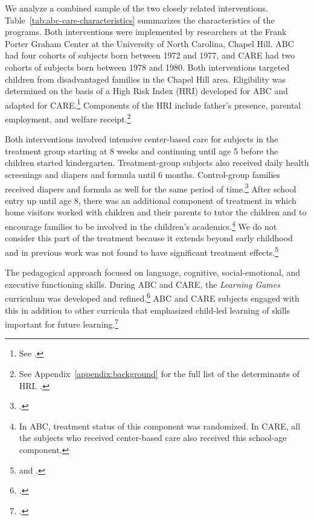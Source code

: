 We analyze a combined sample of the two closely related interventions. Table~\ref{tab:abc-care-characteristics} summarizes the characteristics of the programs. Both interventions were implemented by researchers at the Frank Porter Graham Center at the University of North Carolina, Chapel Hill. ABC had four cohorts of subjects born between 1972 and 1977, and CARE had two cohorts of subjects born between 1978 and 1980. Both interventions targeted children from disadvantaged families in the Chapel Hill area. Eligibility was determined on the basis of a High Risk Index (HRI) developed for ABC and adapted for CARE.\footnote{See \citet{Campbell_Wasik_etal_2008_ECRQ}.} Components of the HRI include father's presence, parental employment, and welfare receipt.\footnote{See Appendix~\ref{appendix:background} for the full list of the determinants of HRI. \citet{Ramey_Smith_1977_AJMD, Wasik_Ramey_etal_1990_CD, Ramey_Campbell_1991_childreninpoverty}.}

Both interventions involved intensive center-based care for subjects in the treatment group starting at 8 weeks and continuing until age 5 before the children started kindergarten. Treatment-group subjects also received daily health screenings and diapers and formula until 6 months. Control-group families received diapers and formula as well for the same period of time.\footnote{\citet{Wasik_Ramey_etal_1990_CD}.}  After school entry up until age 8, there was an additional component of treatment in which home visitors worked with children and their parents to tutor the children and to encourage families to be involved in the children's academics.\footnote{In ABC, treatment status of this component was randomized. In CARE, all the subjects who received center-based care also received this school-age component.} We do not consider this part of the treatment because it extends beyond early childhood and in previous work was not found to have significant treatment effects.\footnote{\citet{Campbell_Ramey_etal_2002_ADS} and \citet{Campbell_Conti_etal_2014_EarlyChildhoodInvestments}.}

The pedagogical approach focused on language, cognitive, social-emotional, and executive functioning skills. During ABC and CARE, the \textit{Learning Games} curriculum was developed and refined.\footnote{\citet{Sparling_Lewis_1979_BOOKLearninggamesFirstThree}.} ABC and CARE subjects engaged with this in addition to other curricula that emphasized child-led learning of skills important for future learning.\footnote{\citet{Conti_etal_2016_LongTermHealth}.}

